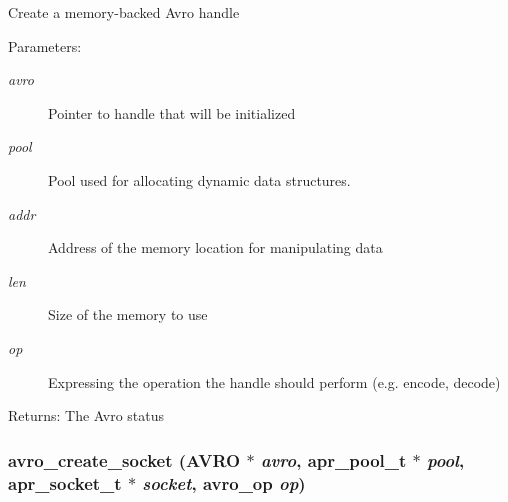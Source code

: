 Create a memory-backed Avro handle \begin{Desc}
\item[Parameters:]
\begin{description}
\item[{\em avro}]Pointer to handle that will be initialized \item[{\em pool}]Pool used for allocating dynamic data structures. \item[{\em addr}]Address of the memory location for manipulating data \item[{\em len}]Size of the memory to use \item[{\em op}]Expressing the operation the handle should perform (e.g. encode, decode) \end{description}
\end{Desc}
\begin{Desc}
\item[Returns:]The Avro status \end{Desc}
\hypertarget{group___handle___routines_g2fb229d05fdcaad3da0f6a9899bd09be}{
\subsubsection[{avro\_\-create\_\-socket}]{ avro\_\-create\_\-socket ({\bf AVRO} $\ast$ {\em avro}, \/  apr\_\-pool\_\-t $\ast$ {\em pool}, \/  apr\_\-socket\_\-t $\ast$ {\em socket}, \/  {\bf avro\_\-op} {\em op})}}
\label{group___handle___routines_g2fb229d05fdcaad3da0f6a9899bd09be}


